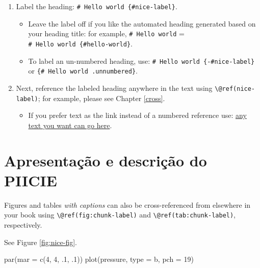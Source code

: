 \documentclass[
]{book}
\newenvironment{Shaded}{\begin{snugshade}}{\end{snugshade}}
\newcommand{\AttributeTok}[1]{\textcolor[rgb]{0.77,0.63,0.00}{#1}}
\newcommand{\DecValTok}[1]{\textcolor[rgb]{0.00,0.00,0.81}{#1}}
\newcommand{\FunctionTok}[1]{\textcolor[rgb]{0.00,0.00,0.00}{#1}}
\newcommand{\NormalTok}[1]{#1}
\newcommand{\StringTok}[1]{\textcolor[rgb]{0.31,0.60,0.02}{#1}}
\providecommand{\tightlist}{%
  \setlength{\itemsep}{0pt}\setlength{\parskip}{0pt}}
\theoremstyle{definition}
\theoremstyle{definition}
\theoremstyle{definition}
\theoremstyle{definition}
\theoremstyle{remark}
\begin{document}
\begin{enumerate}
\def\labelenumi{\arabic{enumi}.}
\tightlist
\item
  Label the heading: \texttt{\#\ Hello\ world\ \{\#nice-label\}}.

  \begin{itemize}
  \tightlist
  \item
    Leave the label off if you like the automated heading generated based on your heading title: for example, \texttt{\#\ Hello\ world} = \texttt{\#\ Hello\ world\ \{\#hello-world\}}.
  \item
    To label an un-numbered heading, use: \texttt{\#\ Hello\ world\ \{-\#nice-label\}} or \texttt{\{\#\ Hello\ world\ .unnumbered\}}.
  \end{itemize}
\item
  Next, reference the labeled heading anywhere in the text using \texttt{\textbackslash{}@ref(nice-label)}; for example, please see Chapter \ref{cross}.

  \begin{itemize}
  \tightlist
  \item
    If you prefer text as the link instead of a numbered reference use: \protect\hyperlink{cross}{any text you want can go here}.
  \end{itemize}
\end{enumerate}

\hypertarget{apresentauxe7uxe3o-e-descriuxe7uxe3o-do-piicie}{%
\section{Apresentação e descrição do PIICIE}\label{apresentauxe7uxe3o-e-descriuxe7uxe3o-do-piicie}}

Figures and tables \emph{with captions} can also be cross-referenced from elsewhere in your book using \texttt{\textbackslash{}@ref(fig:chunk-label)} and \texttt{\textbackslash{}@ref(tab:chunk-label)}, respectively.

See Figure \ref{fig:nice-fig}.

\begin{Shaded}
\begin{Highlighting}[]
\FunctionTok{par}\NormalTok{(}\AttributeTok{mar =} \FunctionTok{c}\NormalTok{(}\DecValTok{4}\NormalTok{, }\DecValTok{4}\NormalTok{, .}\DecValTok{1}\NormalTok{, .}\DecValTok{1}\NormalTok{))}
\FunctionTok{plot}\NormalTok{(pressure, }\AttributeTok{type =} \StringTok{\textquotesingle{}b\textquotesingle{}}\NormalTok{, }\AttributeTok{pch =} \DecValTok{19}\NormalTok{)}
\end{Highlighting}
\end{Shaded}
\end{document}
